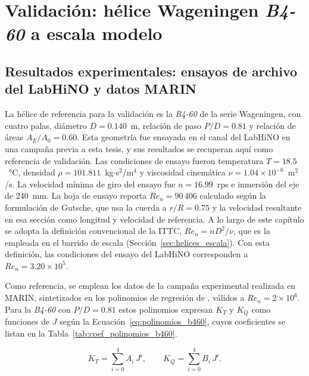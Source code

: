 \section{Validación: hélice Wageningen \textit{B4-60} a escala modelo}
\label{sec:helices_validacion}

\subsection{Resultados experimentales: ensayos de archivo del LabHiNO y datos MARIN}
\label{sec:helices_efd}

La hélice de referencia para la validación es la \textit{B4-60} de la serie Wageningen, con cuatro palas, diámetro $D = 0.140$~m, relación de paso $P/D = 0.81$ y relación de áreas $A_E/A_0 = 0.60$. Esta geometría fue ensayada en el canal del LabHiNO en una campaña previa a esta tesis, y sus resultados se recuperan aquí como referencia de validación. Las condiciones de ensayo fueron temperatura $T = 18.5$~°C, densidad $\rho = 101.811$~kg$\cdot$s$^2$/m$^4$ y viscosidad cinemática $\nu = 1.04 \times 10^{-6}$~m$^2$/s. La velocidad mínima de giro del ensayo fue $n = 16.99$~rps e inmersión del eje de 240~mm. La hoja de ensayo reporta $Re_n = 90\,406$ calculado según la formulación de Gutsche, que usa la cuerda a $r/R = 0.75$ y la velocidad resultante en esa sección como longitud y velocidad de referencia. A lo largo de este capítulo se adopta la definición convencional de la ITTC, $Re_n = n D^2 / \nu$, que es la empleada en el barrido de escala (Sección~\ref{sec:helices_escala}). Con esta definición, las condiciones del ensayo del LabHiNO corresponden a $Re_n = 3.20 \times 10^5$.

Como referencia, se emplean los datos de la campaña experimental realizada en MARIN, sintetizados en los polinomios de regresión de \citet{oosterveld1975}, válidos a $Re_n = 2 \times 10^6$. Para la \textit{B4-60} con $P/D = 0.81$ estos polinomios expresan $K_T$ y $K_Q$ como funciones de $J$ según la Ecuación~\ref{eq:polinomios_b460}, cuyos coeficientes se listan en la Tabla~\ref{tab:coef_polinomios_b460}.

\begin{equation}
K_T = \sum_{i=0}^{4} A_i \, J^i, \qquad K_Q = \sum_{i=0}^{4} B_i \, J^i.
\label{eq:polinomios_b460}
\end{equation}

